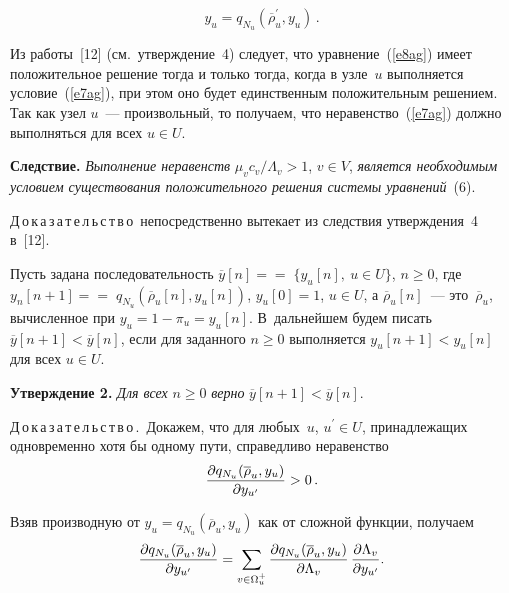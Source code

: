 \begin{multicols}{2}
\noindent
\begin{equation}
y_u = q_{N_u} (\overline{\rho}_u^\prime, y_u)\,.
\label{e8ag}
\end{equation}
     
     Из работы~[12] (см.\ утверждение~4) следует, что уравнение~(\ref{e8ag}) 
имеет положительное решение тогда и только тогда, когда в узле~$u$ 
выполняется условие~(\ref{e7ag}), при этом оно будет единственным 
положительным решением. Так как узел $u$~--- произвольный, то получаем, 
что неравенство~(\ref{e7ag}) должно выполняться для всех $u\in U$.
     
     \smallskip
     
     \noindent
     \textbf{Следствие.} \textit{Выполнение неравенств} $\mu_v c_v / 
\Lambda_v >1$, $v\in V$, \textit{является необходимым условием 
существования положительного решения системы уравнений}~(6).
     
     \smallskip
     
     \noindent
     Д\,о\,к\,а\,з\,а\,т\,е\,л\,ь\,с\,т\,в\,о\ непосредственно вытекает из следствия 
утверждения~4 в~[12].
     
     \smallskip
     Пусть задана последовательность $\overline{y}[n] =$\linebreak $=\;\{ y_u [n],\ u\in U\}$, 
$n\geq 0$, где $y_n[n+1]=$\linebreak $=\;q_{N_u}(\overline{\rho}_u[n],y_u[n])$, 
$y_u[0]=1$, $u\in U$, а $\overline{\rho}_u[n]$~--- это~$\overline{\rho}_u$, 
вычисленное при $y_u =1-\pi_u =y_u[n]$. В~дальнейшем будем писать 
$\overline{y}[n+1]<\overline{y}[n]$, если для заданного $n\geq 0$ выполняется 
$y_u[n+1]<y_u[n]$ для всех $u\in U$.
     
     \smallskip
     
     \noindent
     \textbf{Утверждение 2.} \textit{Для всех} $n\geq 0$ \textit{верно} 
$\overline{y}[n+1] <\overline{y}[n]$.
     \smallskip
     
     \noindent
     Д\,о\,к\,а\,з\,а\,т\,е\,л\,ь\,с\,т\,в\,о\,.\ Докажем, что для любых~$u$, 
$u^\prime \in U$, принадлежащих одновременно хотя бы одному пути, 
справедливо неравенство
     \begin{equation}
     \displaystyle\frac{\displaystyle \partial q_{N_u}(\overline{\rho}_u,y_u)\mathstrut}{\displaystyle \partial y_{u^\prime}\mathstrut}>0\,.
     \end{equation}
     
     Взяв производную от $y_u =q_{N_u}(\overline{\rho}_u,y_u)$ как от 
сложной функции, получаем
     \begin{equation}
     \displaystyle\frac{\displaystyle \partial q_{N_u}(\overline{\rho}_u,y_u)\mathstrut}{\displaystyle \partial y_{u^\prime}\mathstrut} = 
\sum\limits_{v\in\Omega_u^+}\displaystyle\frac{\displaystyle \partial q_{N_u}(\overline{\rho}_u,y_u)\mathstrut}{\displaystyle \partial 
\Lambda_v\mathstrut}\,\displaystyle\frac{\displaystyle \partial \Lambda_v\mathstrut}{\displaystyle \partial y_{u^\prime}\mathstrut}.
     \end{equation}
     

\end{multicols}
